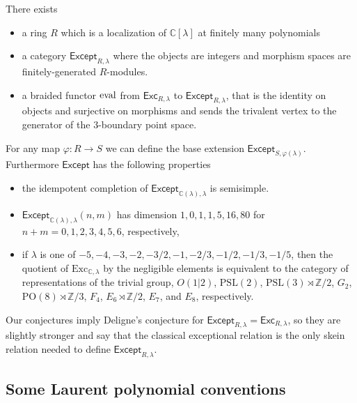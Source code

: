 \documentclass[12pt]{amsart}
\begin{document}
\begin{conjecture}
There exists
  \begin{itemize}
  \item a ring $R$ which is a localization of $\mathbb{C}[\lambda]$ at finitely many polynomials
  \item a category $\mathsf{Except}_{R,\lambda}$ where the objects are integers and morphism spaces are finitely-generated $R$-modules.
  \item a braided functor $\operatorname{eval}$ from $\mathsf{Exc}_{R,\lambda}$ to $\mathsf{Except}_{R,\lambda}$, that is the identity on objects and surjective on morphisms and sends the trivalent vertex to the generator of the $3$-boundary point space. 
  \end{itemize}
For any map $\varphi: R \rightarrow S$ we can define the base extension $\mathsf{Except}_{S,\varphi(\lambda)}$.  Furthermore $\mathsf{Except}$ has the following properties
\begin{itemize}
\item the idempotent completion of $\mathsf{Except}_{\mathbb{C}(\lambda),\lambda}$ is semisimple.
\item $\mathsf{Except}_{\mathbb{C}(\lambda),\lambda}(n,m)$ has dimension $1,\allowbreak0,\allowbreak1,\allowbreak1,\allowbreak5,\allowbreak16,\allowbreak80$
for $n+m=0,1,2,3,4,5,6$, respectively, 
\item if $\lambda$ is one of $-5, -4, -3, -2, -3/2,-1,-2/3,-1/2,-1/3,-1/5$, then the quotient of $\mathrm{Exc}_{\mathbb{C},\lambda}$ by the negligible elements is equivalent to the category of representations of the trivial group, $O(1 | 2)$, $\mathrm{PSL}(2)$, $\mathrm{PSL}(3) \rtimes \mathbb{Z}/2$, $G_2$, $\mathrm{PO}(8) \rtimes \mathbb{Z}/3$, $F_4$, $E_6 \rtimes \mathbb{Z}/2$, $E_7$, and $E_8$, respectively.
\end{itemize}
\end{conjecture}

Our conjectures imply Deligne's conjecture for $\mathsf{Except}_{R,\lambda} = \mathsf{Exc}_{R,\lambda}$, so they are slightly stronger and say that the classical exceptional relation is the only skein relation needed to define $\mathsf{Except}_{R,\lambda}$.

\subsection{Some Laurent polynomial conventions}
\end{document}
